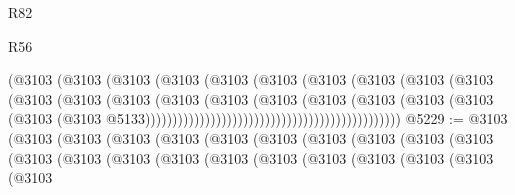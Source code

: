 \begin{lexlean}{R82}
\begin{lexlean}{R56}
\begin{coremodule}
{{{{{{{{{{{{{{{{{{{{{{{{{{{{{{{{{{{{{{{{{{{{{{{{{{{{{{{{{{{{{{{{{{{{{{{{{{{{{{{{{{{{{{{{{{{{{{{{{{{{{{{{{{{{{{{{{{{{{{{{{{{{{{{{{{{{{{{{{{{{{{{{{{{{{{{{{{{{{{{{{{{{{{{{{{{{{{{{{{{{{{{{{{{{{{{{{{{{{{{{{{{{{{{{{{{                                                      (@3103
                                                        (@3103
                                                          (@3103
                                                            (@3103
                                                              (@3103
                                                                (@3103
                                                                  (@3103
                                                                    (@3103
                                                                      (@3103
                                                                        (@3103
                                                                          (@3103
                                                                            (@3103
                                                                              (@3103
                                                                                (@3103
                                                                                  (@3103
                                                                                    (@3103
                                                                                      (@3103
                                                                                        (@3103
                                                                                          (@3103
                                                                                            (@3103
                                                                                              (@3103
                                                                                                (@3103
                                                                                                  @5133)))))))))))))))))))))))))))))))))))))))))))))))
@5229 := @3103
    (@3103
      (@3103
        (@3103
          (@3103
            (@3103
              (@3103
                (@3103
                  (@3103
                    (@3103
                      (@3103
                        (@3103
                          (@3103
                            (@3103
                              (@3103
                                (@3103
                                  (@3103
                                    (@3103
                                      (@3103
                                        (@3103
                                          (@3103
                                            (@3103
}}}}}}}}}}}}}}}}}}}}}}}}}}}}}}}}}}}}}}}}}}}}}}}}}}}}}}}}}}}}}}}}}}}}}}}}}}}}}}}}}}}}}}}}}}}}}}}}}}}}}}}}}}}}}}}}}}}}}}}}}}}}}}}}}}}}}}}}}}}}}}}}}}}}}}}}}}}}}}}}}}}}}}}}}}}}}}}}}}}}}}}}}}}}}}}}}}}}}}}}}}}}}}}}}}}
\end{coremodule}
\end{lexlean}
\end{lexlean}
